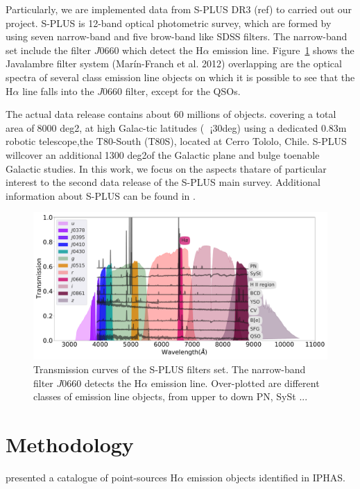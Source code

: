 \documentclass[fleqn,usenatbib]{mnras}
\begin{document}
Particularly, we are implemented data from S-PLUS DR3 (ref) to carried out our project. S-PLUS is 12-band optical photometric survey, which are formed by using seven narrow-band and five brow-band like SDSS filters. The narrow-band set include the filter $J$0660 which detect the H{$\alpha$} emission line. Figure~\ref{fig:curves} shows the Javalambre filter system (Marín-Franch et al. 2012) overlapping are the optical spectra of several class emission line objects on which it is possible to see that the H{$\alpha$} line falls into the $J$0660 filter, except for the QSOs.   

The actual data release contains about 60 millions of objects. covering a total area of8000 deg2, at high Galac-tic latitudes (𝑏 ¡30deg) using a dedicated 0.83m robotic telescope,the T80-South (T80S), located at Cerro Tololo, Chile. S-PLUS willcover an additional1300 deg2of the Galactic plane and bulge toenable Galactic studies. In this work, we focus on the aspects thatare of particular interest to the second data release of the S-PLUS main survey. Additional information about S-PLUS can be found in \citet{Mendes:2019}. 

\begin{figure}
    \includegraphics[width=0.9\linewidth]{Figs/splus-filter.pdf}
    \caption{Transmission curves of the S-PLUS filters set. The narrow-band filter $J0660$ detects the H$\alpha$ emission line. Over-plotted are different classes of emission line objects, from upper to down PN, SySt ... }
    \label{fig:curves}
\end{figure}


\section{Methodology}
\label{sec:meth}

\citet{Witham:2008} presented a catalogue of point-sources H{$\alpha$} emission objects identified in IPHAS. 
\end{document}
